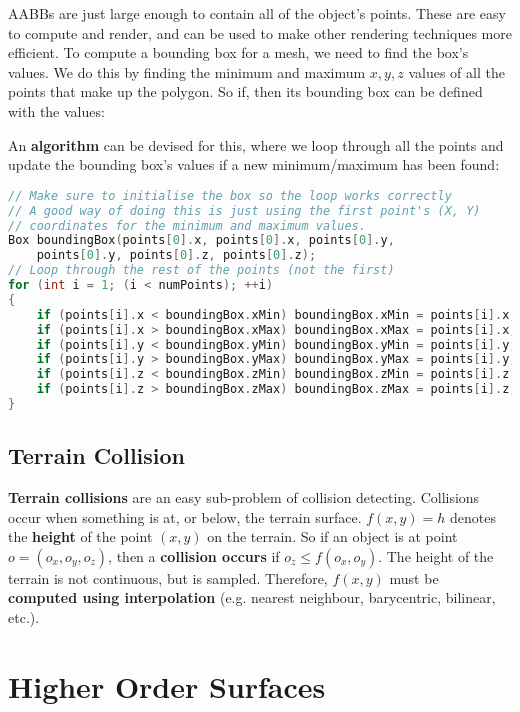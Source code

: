 \documentclass{article}
\begin{document}
AABBs are just large enough to contain all of the object's points. These are easy to compute and render, and can be used to make other rendering techniques more efficient. To compute a bounding box for a mesh, we need to find the box's values. We do this by finding the minimum and maximum $x,y,z$ values of all the points that make up the polygon. So if, then its bounding box can be defined with the values:

An \textbf{algorithm} can be devised for this, where we loop through all the points and update the bounding box's values if a new minimum/maximum has been found:
\begin{lstlisting}[language=c]
// Make sure to initialise the box so the loop works correctly
// A good way of doing this is just using the first point's (X, Y)
// coordinates for the minimum and maximum values.
Box boundingBox(points[0].x, points[0].x, points[0].y,
	points[0].y, points[0].z, points[0].z);
// Loop through the rest of the points (not the first)
for (int i = 1; (i < numPoints); ++i)
{
    if (points[i].x < boundingBox.xMin) boundingBox.xMin = points[i].x;
    if (points[i].x > boundingBox.xMax) boundingBox.xMax = points[i].x;
    if (points[i].y < boundingBox.yMin) boundingBox.yMin = points[i].y;
    if (points[i].y > boundingBox.yMax) boundingBox.yMax = points[i].y;
    if (points[i].z < boundingBox.zMin) boundingBox.zMin = points[i].z;
    if (points[i].z > boundingBox.zMax) boundingBox.zMax = points[i].z;
}
\end{lstlisting}

\subsection{Terrain Collision}

\textbf{Terrain collisions} are an easy sub-problem of collision detecting. Collisions occur when something is at, or below, the terrain surface. $f(x, y) = h$ denotes the \textbf{height} of the point $(x, y)$ on the terrain. So if an object is at point $o = (o_x, o_y, o_z)$, then a \textbf{collision occurs} if $o_z \leq f(o_x, o_y)$. The height of the terrain is not continuous, but is sampled. Therefore, $f(x, y)$ must be \textbf{computed using interpolation} (e.g. nearest neighbour, barycentric, bilinear, etc.).

\section{Higher Order Surfaces}
\end{document}
